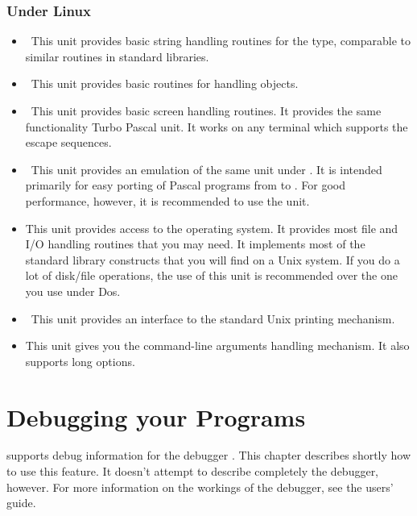 \documentclass{report}
\begin{document}
\subsection{Under Linux}
\begin{itemize}
\item \seestrings\ This unit provides basic
string handling routines for the  type, comparable to similar
routines in standard  libraries.
\item \seeobjects\ This unit provides basic
routines for handling objects.
\item \seecrt\ This unit provides basic screen
handling routines. It provides the same functionality Turbo Pascal 
unit. It works on any terminal which supports the  escape
sequences.
\item \seedos\ This unit provides an emulation of the
same unit under \dos. It is intended primarily for easy porting of Pascal
programs from \dos to \linux. For good performance, however, it is
recommended to use the  unit.
\item \seelinux This unit provides access to the
\linux operating system. It provides most file and I/O handling routines
that you may need. It implements most of the standard  library constructs
that you will find on a Unix system. If you do a lot of disk/file
operations, the use of this unit is recommended over the one you use under
Dos.
\item \seeprinter\ This unit provides an
interface to the standard Unix printing mechanism.
\item \seegetopts This unit gives you the
\gnu {} command-line arguments  handling mechanism. 
It also supports long options.
\end{itemize}


\chapter{Debugging your Programs}

\fpc supports debug information for the \gnu debugger . 
This chapter describes shortly how to use this feature. It doesn't attempt
to describe completely the \gnu debugger, however.
For more information on the workings of the \gnu debugger, see the 
users' guide.
\end{document}
